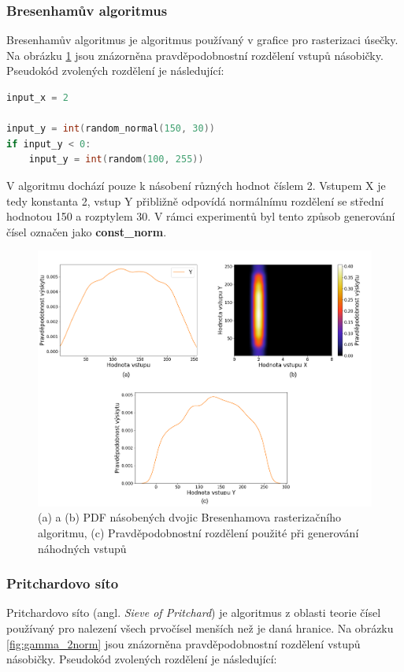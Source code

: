 \pagebreak

\subsubsection{Bresenhamův algoritmus}
Bresenhamův algoritmus je algoritmus používaný v grafice pro rasterizaci úsečky. Na obrázku \ref{fig:const_norm} jsou znázorněna pravděpodobnostní rozdělení vstupů násobičky. Pseudokód zvolených rozdělení je následující:

\begin{lstlisting}[language={C}, label={lst:bresenham}]
input_x = 2

input_y = int(random_normal(150, 30))
if input_y < 0:
    input_y = int(random(100, 255))
\end{lstlisting}

V algoritmu dochází pouze k násobení různých hodnot číslem 2. Vstupem X je tedy konstanta 2, vstup Y přibližně odpovídá normálnímu rozdělení se střední hodnotou 150 a rozptylem 30. V rámci experimentů byl tento způsob generování čísel označen jako \textbf{const\_norm}.

\begin{figure}[H]
    \centering
    \includegraphics[width=\textwidth]{obrazky-figures/const_norm_all.png}
    \caption{(a) a (b) PDF násobených dvojic Bresenhamova rasterizačního algoritmu, (c) Pravděpodobnostní rozdělení použité při generování náhodných vstupů}
    \label{fig:const_norm}
\end{figure}

\pagebreak

\subsubsection{Pritchardovo síto}
Pritchardovo síto (angl. \textit{Sieve of Pritchard}) je algoritmus z oblasti teorie čísel používaný pro nalezení všech prvočísel menších než je daná hranice. Na obrázku \ref{fig:gamma_2norm} jsou znázorněna pravděpodobnostní rozdělení vstupů násobičky. Pseudokód zvolených rozdělení je následující:

